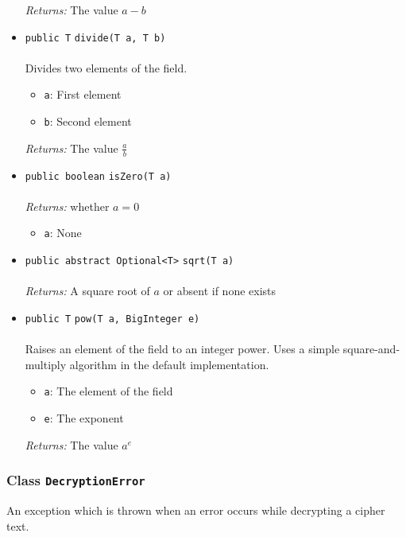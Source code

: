 \begin{itemize}
\emph{Returns:} The value $a - b$

\item \lstinline|public T| \lstinline|divide|\lstinline|(T a, T b)|\\ \\[-0.6em]
Divides two elements of the field.
\begin{itemize}
\item \lstinline|a|: First element
\item \lstinline|b|: Second element
\end{itemize}

\emph{Returns:} The value $\frac{a}{b}$

\item \lstinline|public boolean| \lstinline|isZero|\lstinline|(T a)|\\ \\[-0.6em]
\emph{Returns:} whether $a = 0$
\begin{itemize}
\item \lstinline|a|: None
\end{itemize}



\item \lstinline|public abstract Optional<T>| \lstinline|sqrt|\lstinline|(T a)|\\ \\[-0.6em]
\emph{Returns:} A square root of $a$ or absent if none exists



\item \lstinline|public T| \lstinline|pow|\lstinline|(T a, BigInteger e)|\\ \\[-0.6em]
Raises an element of the field to an integer power.
 Uses a simple square-and-multiply algorithm in the default
 implementation.
\begin{itemize}
\item \lstinline|a|: The element of the field
\item \lstinline|e|: The exponent
\end{itemize}

\emph{Returns:} The value $a^e$

\end{itemize}

\subsubsection{Class \lstinline|DecryptionError|}
An exception which is thrown when an error occurs while decrypting a cipher
 text. \\
\noindent\begin{minipage}[t]{5cm}
\vspace{0.3em}
\hspace*{2em}
\vspace{0.3em}
\end{minipage}



